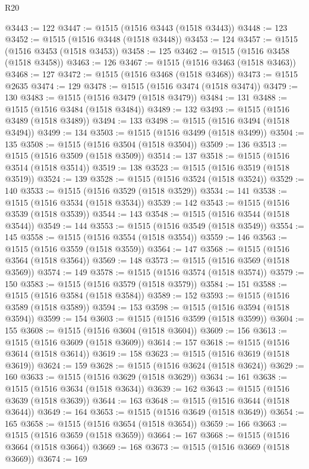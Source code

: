 \begin{lexlean}{R20}
\begin{coremodule}
{@3443 := 122
@3447 := @1515 (@1516 @3443 (@1518 @3443))
@3448 := 123
@3452 := @1515 (@1516 @3448 (@1518 @3448))
@3453 := 124
@3457 := @1515 (@1516 @3453 (@1518 @3453))
@3458 := 125
@3462 := @1515 (@1516 @3458 (@1518 @3458))
@3463 := 126
@3467 := @1515 (@1516 @3463 (@1518 @3463))
@3468 := 127
@3472 := @1515 (@1516 @3468 (@1518 @3468))
@3473 := @1515 @2635
@3474 := 129
@3478 := @1515 (@1516 @3474 (@1518 @3474))
@3479 := 130
@3483 := @1515 (@1516 @3479 (@1518 @3479))
@3484 := 131
@3488 := @1515 (@1516 @3484 (@1518 @3484))
@3489 := 132
@3493 := @1515 (@1516 @3489 (@1518 @3489))
@3494 := 133
@3498 := @1515 (@1516 @3494 (@1518 @3494))
@3499 := 134
@3503 := @1515 (@1516 @3499 (@1518 @3499))
@3504 := 135
@3508 := @1515 (@1516 @3504 (@1518 @3504))
@3509 := 136
@3513 := @1515 (@1516 @3509 (@1518 @3509))
@3514 := 137
@3518 := @1515 (@1516 @3514 (@1518 @3514))
@3519 := 138
@3523 := @1515 (@1516 @3519 (@1518 @3519))
@3524 := 139
@3528 := @1515 (@1516 @3524 (@1518 @3524))
@3529 := 140
@3533 := @1515 (@1516 @3529 (@1518 @3529))
@3534 := 141
@3538 := @1515 (@1516 @3534 (@1518 @3534))
@3539 := 142
@3543 := @1515 (@1516 @3539 (@1518 @3539))
@3544 := 143
@3548 := @1515 (@1516 @3544 (@1518 @3544))
@3549 := 144
@3553 := @1515 (@1516 @3549 (@1518 @3549))
@3554 := 145
@3558 := @1515 (@1516 @3554 (@1518 @3554))
@3559 := 146
@3563 := @1515 (@1516 @3559 (@1518 @3559))
@3564 := 147
@3568 := @1515 (@1516 @3564 (@1518 @3564))
@3569 := 148
@3573 := @1515 (@1516 @3569 (@1518 @3569))
@3574 := 149
@3578 := @1515 (@1516 @3574 (@1518 @3574))
@3579 := 150
@3583 := @1515 (@1516 @3579 (@1518 @3579))
@3584 := 151
@3588 := @1515 (@1516 @3584 (@1518 @3584))
@3589 := 152
@3593 := @1515 (@1516 @3589 (@1518 @3589))
@3594 := 153
@3598 := @1515 (@1516 @3594 (@1518 @3594))
@3599 := 154
@3603 := @1515 (@1516 @3599 (@1518 @3599))
@3604 := 155
@3608 := @1515 (@1516 @3604 (@1518 @3604))
@3609 := 156
@3613 := @1515 (@1516 @3609 (@1518 @3609))
@3614 := 157
@3618 := @1515 (@1516 @3614 (@1518 @3614))
@3619 := 158
@3623 := @1515 (@1516 @3619 (@1518 @3619))
@3624 := 159
@3628 := @1515 (@1516 @3624 (@1518 @3624))
@3629 := 160
@3633 := @1515 (@1516 @3629 (@1518 @3629))
@3634 := 161
@3638 := @1515 (@1516 @3634 (@1518 @3634))
@3639 := 162
@3643 := @1515 (@1516 @3639 (@1518 @3639))
@3644 := 163
@3648 := @1515 (@1516 @3644 (@1518 @3644))
@3649 := 164
@3653 := @1515 (@1516 @3649 (@1518 @3649))
@3654 := 165
@3658 := @1515 (@1516 @3654 (@1518 @3654))
@3659 := 166
@3663 := @1515 (@1516 @3659 (@1518 @3659))
@3664 := 167
@3668 := @1515 (@1516 @3664 (@1518 @3664))
@3669 := 168
@3673 := @1515 (@1516 @3669 (@1518 @3669))
@3674 := 169
}
\end{coremodule}
\end{lexlean}

